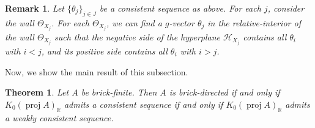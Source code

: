 \documentclass{amsart}
\theoremstyle{thmstyle}
\newtheorem{theorem}[thm]{Theorem}
\theoremstyle{exstyle}
\theoremstyle{defstyle}
\theoremstyle{remstyle}
\newtheorem{remark}[thm]{Remark}
\theoremstyle{remstyle}
\DeclareMathOperator*{\proj}{proj}
\begin{document}
\begin{remark}
   Let $\{\theta_j\}_{j\in J}$ be a consistent sequence as above. For each $j$, consider the wall $\Theta_{X_j}$. For each $\Theta_{X_j}$, we can find a $g$-vector $\theta_j$ in the relative-interior of the wall $\Theta_{X_j}$ such that the negative side of the hyperplane $\mathcal{H}_{X_j}$ contains all $\theta_i$ with $i < j$, and its positive side contains all $\theta_i$ with $i > j$. 
\end{remark}
 
Now, we show the main result of this subsection. 

 \begin{theorem}\label{Prop: walls ordered consistently}
     Let $A$ be brick-finite. Then $A$ is brick-directed if and only if $K_0(\proj A)_{\mathbb{R}}$ admits a consistent sequence if and only if $K_0(\proj A)_{\mathbb{R}}$ admits a weakly consistent sequence.    
 \end{theorem}
\end{document}
